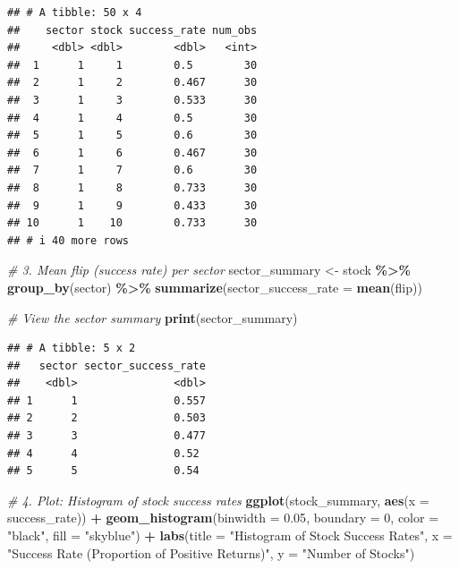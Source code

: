 \documentclass[
  11pt,
]{article}
\newenvironment{Shaded}{\begin{snugshade}}{\end{snugshade}}
\newcommand{\AttributeTok}[1]{\textcolor[rgb]{0.13,0.29,0.53}{#1}}
\newcommand{\CommentTok}[1]{\textcolor[rgb]{0.56,0.35,0.01}{\textit{#1}}}
\newcommand{\DecValTok}[1]{\textcolor[rgb]{0.00,0.00,0.81}{#1}}
\newcommand{\FloatTok}[1]{\textcolor[rgb]{0.00,0.00,0.81}{#1}}
\newcommand{\FunctionTok}[1]{\textcolor[rgb]{0.13,0.29,0.53}{\textbf{#1}}}
\newcommand{\NormalTok}[1]{#1}
\newcommand{\OtherTok}[1]{\textcolor[rgb]{0.56,0.35,0.01}{#1}}
\newcommand{\SpecialCharTok}[1]{\textcolor[rgb]{0.81,0.36,0.00}{\textbf{#1}}}
\newcommand{\StringTok}[1]{\textcolor[rgb]{0.31,0.60,0.02}{#1}}
\begin{document}
\begin{verbatim}
## # A tibble: 50 x 4
##    sector stock success_rate num_obs
##     <dbl> <dbl>        <dbl>   <int>
##  1      1     1        0.5        30
##  2      1     2        0.467      30
##  3      1     3        0.533      30
##  4      1     4        0.5        30
##  5      1     5        0.6        30
##  6      1     6        0.467      30
##  7      1     7        0.6        30
##  8      1     8        0.733      30
##  9      1     9        0.433      30
## 10      1    10        0.733      30
## # i 40 more rows
\end{verbatim}

\begin{Shaded}
\begin{Highlighting}[]
\CommentTok{\# 3. Mean flip (success rate) per sector}
\NormalTok{sector\_summary }\OtherTok{\textless{}{-}}\NormalTok{ stock }\SpecialCharTok{\%\textgreater{}\%}
  \FunctionTok{group\_by}\NormalTok{(sector) }\SpecialCharTok{\%\textgreater{}\%}
  \FunctionTok{summarize}\NormalTok{(}\AttributeTok{sector\_success\_rate =} \FunctionTok{mean}\NormalTok{(flip))}

\CommentTok{\# View the sector summary}
\FunctionTok{print}\NormalTok{(sector\_summary)}
\end{Highlighting}
\end{Shaded}

\begin{verbatim}
## # A tibble: 5 x 2
##   sector sector_success_rate
##    <dbl>               <dbl>
## 1      1               0.557
## 2      2               0.503
## 3      3               0.477
## 4      4               0.52 
## 5      5               0.54
\end{verbatim}

\begin{Shaded}
\begin{Highlighting}[]
\CommentTok{\# 4. Plot: Histogram of stock success rates}
\FunctionTok{ggplot}\NormalTok{(stock\_summary, }\FunctionTok{aes}\NormalTok{(}\AttributeTok{x =}\NormalTok{ success\_rate)) }\SpecialCharTok{+}
  \FunctionTok{geom\_histogram}\NormalTok{(}\AttributeTok{binwidth =} \FloatTok{0.05}\NormalTok{, }\AttributeTok{boundary =} \DecValTok{0}\NormalTok{, }\AttributeTok{color =} \StringTok{"black"}\NormalTok{, }\AttributeTok{fill =} \StringTok{"skyblue"}\NormalTok{) }\SpecialCharTok{+}
  \FunctionTok{labs}\NormalTok{(}\AttributeTok{title =} \StringTok{"Histogram of Stock Success Rates"}\NormalTok{,}
       \AttributeTok{x =} \StringTok{"Success Rate (Proportion of Positive Returns)"}\NormalTok{,}
       \AttributeTok{y =} \StringTok{"Number of Stocks"}\NormalTok{)}
\end{Highlighting}
\end{Shaded}
\end{document}
